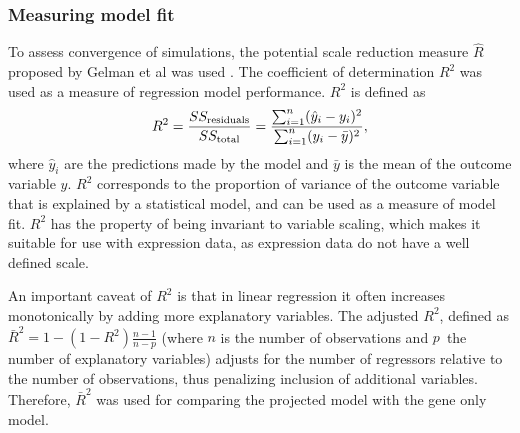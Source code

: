 \subsubsection{Measuring model fit}

To assess convergence of simulations, the potential scale reduction
measure $\hat{R}$ proposed by Gelman et al was used \citep{Gelman2013}.
The coefficient of determination $R^2$ was used as a measure
of regression model performance. $R^2$ is defined as
\begin{equation}
	R^2 = \frac{SS_{\textup{residuals}}}{SS_{\textup{total}}} = \frac{\sum_{i=1}^{n}(\hat{y}_i-y_i)^2}{\sum_{i=1}^{n}(y_i-\bar{y})^2},
\end{equation}
where $\hat{y}_i$ are the predictions made by the model and $\bar{y}$ is the
mean of the outcome variable $y$. $R^2$ corresponds to the proportion of variance
of the outcome variable that is explained by a statistical model, and can be
used as a measure of model fit. $R^2$ has the property of being invariant to
variable scaling, which makes it suitable for use with expression data, as
expression data do not have a well defined scale.

An important caveat of $R^2$ is that in linear regression it often increases
monotonically by adding more explanatory variables. The adjusted $R^2$,
defined as $\bar{R}^2 = 1-(1-R^2)\frac{n-1}{n-p}$ (where $n$ is the number of
observations and $p$ the number of explanatory variables) adjusts for the
number of regressors relative to the number of observations, thus penalizing
inclusion of additional variables. Therefore, $\bar{R}^2$ was used for comparing the
projected model with the gene only model.
